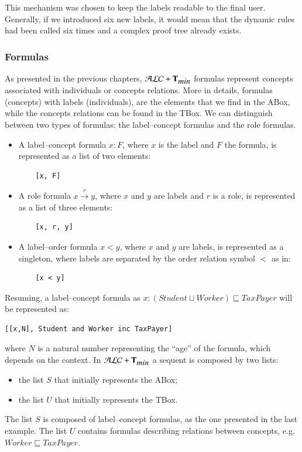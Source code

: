 \documentclass[a4paper, 11pt, oneside]{elsarticle}
\newcommand{\tip}{{\bf T}}
\newcommand{\alctmin}{\mathcal{ALC}+\tip_{\mbox{\em min}}}
\newcommand{\trans}[1]{\stackrel{#1}{\longrightarrow}}
\begin{document}
This mechanism was chosen to keep the labels readable to the final user.
Generally, if we introduced six new labels, it would mean that the dynamic rules had been called six times and a complex proof tree already exists.

\subsubsection{Formulas}
As presented in the previous chapters, $\alctmin$ formulas represent concepts associated with individuals or concepts relations.
More in details, formulas (concepts) with labels (individuals), are the elements that we find in the ABox, while the concepts relations can be found in the TBox.
We can distinguish between two types of formulas: the label--concept formulas and the role formulas.
\begin{itemize}
\item A label--concept formula $x : F$, where $x$ is the label and $F$ the formula, is represented as a list of two elements:
\begin{verbatim}
    [x, F]
\end{verbatim}
\item A role formula $x \trans{r} y$, where $x$ and $y$ are labels and $r$ is a role, is represented as a list of three elements:
\begin{verbatim}
    [x, r, y]
\end{verbatim}
\item A label--order formula $x < y$, where $x$ and $y$ are labels, is represented as a singleton, where labels are separated by the order relation symbol $<$ as in:
\begin{verbatim}
    [x < y]
\end{verbatim}
\end{itemize}
Resuming, a label--concept formula as $x : (Student \sqcup Worker) \sqsubseteq TaxPayer$ will be represented as:
\begin{verbatim}
[[x,N], Student and Worker inc TaxPayer]
\end{verbatim}

where $N$ is a natural number representing the ``age'' of the formula, which depends on the context.
In $\alctmin$ a sequent is composed by two lists:
\begin{itemize}
\item the list $S$ that initially represents the ABox;
\item the list $U$ that initially represents the TBox.
\end{itemize}
The list $S$ is composed of label--concept formulas, as the one presented in the last example.
The list $U$ contains formulas describing relations between concepts, e.g. $Worker \sqsubseteq TaxPayer$.
\end{document}
